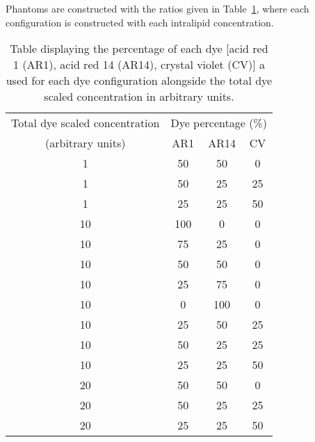 Phantoms are constructed with the ratios given in Table~\ref{tb:phantomratios}, where each configuration is constructed with each intralipid concentration. 

\begin{table}[ht!]
    \centering
    \caption{Table displaying the 
    percentage of each 
    dye [acid red 1 (AR1), acid red 14 (AR14), crystal violet (CV)] a used for each dye configuration alongside the total dye scaled concentration in arbitrary units.}
    \begin{tabular}{|c|c|c|c|}
        \hline
        Total dye scaled concentration & \multicolumn{3}{|c|}{Dye 
        percentage (\%)
        } \\
        (arbitrary units) & AR1 & AR14 & CV \\
        \hline
        1 & 50 & 50 & 0 \\
        1 & 50 & 25 & 25 \\
        1 & 25 & 25 & 50 \\
        10 & 100 & 0 & 0 \\
        10 & 75 & 25 & 0 \\
        10 & 50 & 50 & 0 \\
        10 & 25 & 75 & 0 \\
        10 & 0 & 100 & 0 \\
        10 & 25 & 50 & 25 \\
        10 & 50 & 25 & 25 \\
        10 & 25 & 25 & 50 \\
        20 & 50 & 50 & 0 \\
        20 & 50 & 25 & 25 \\
        20 & 25 & 25 & 50 \\
        \hline
    \end{tabular}
    \label{tb:phantomratios} %
\end{table}

